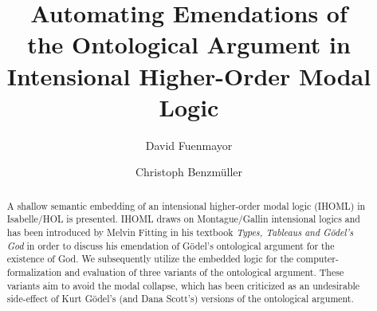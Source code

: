 \documentclass{llncs}
\begin{document}
%
\frontmatter          %
%
\pagestyle{headings}  %

%
\mainmatter              %
%
\title{Automating Emendations of \\
	the Ontological Argument in\\
	Intensional Higher-Order Modal Logic}
%
\author{David Fuenmayor \and Christoph Benzm\"uller}
%

%

\maketitle              %

\begin{abstract}
A shallow semantic embedding of an intensional higher-order modal logic (IHOML) in Isabelle/HOL is presented.
IHOML draws on Montague/Gallin intensional logics and has been introduced by Melvin Fitting in his textbook
\emph{Types, Tableaus and G\"odel's God} in order to discuss his emendation of G\"odel's ontological argument
for the existence of God. We subsequently	utilize the embedded logic for the computer-formalization and evaluation
of three variants of the ontological argument. These variants aim to avoid the modal collapse, which has been criticized as
an undesirable side-effect of Kurt G\"odel's (and Dana Scott's) versions of the ontological argument.
\end{abstract}






%




%
\end{document}
